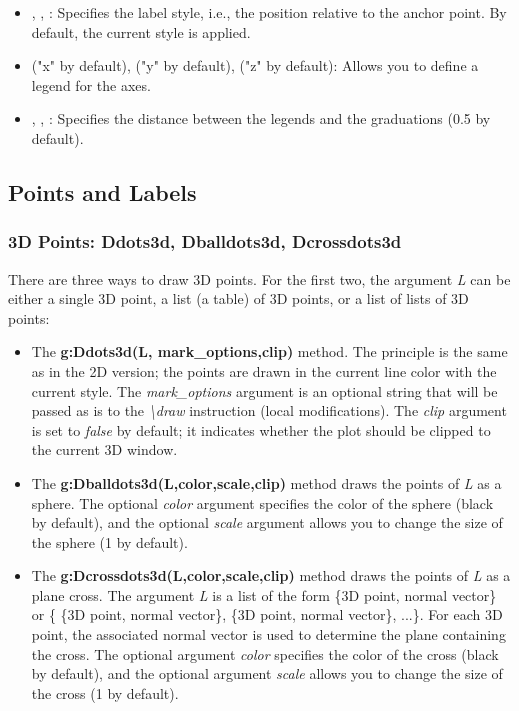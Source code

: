 \begin{itemize}
    \item {}, , : Specifies the label style, i.e., the position relative to the anchor point. By default, the current style is applied.

    \item {} ("x" by default),  ("y" by default),  ("z" by default): Allows you to define a legend for the axes.

    \item {}, , : Specifies the distance between the legends and the graduations (0.5 by default).
\end{itemize}

\subsection{Points and Labels}

\subsubsection{3D Points: Ddots3d, Dballdots3d, Dcrossdots3d}

There are three ways to draw 3D points. For the first two, the argument \emph{L} can be either a single 3D point, a list (a table) of 3D points, or a list of lists of 3D points:

\begin{itemize}
    \item The \textbf{g:Ddots3d(L, mark\_options,clip)} method. The principle is the same as in the 2D version; the points are drawn in the current line color with the current style. The \emph{mark\_options} argument is an optional string that will be passed as is to the \emph{\textbackslash draw} instruction (local modifications). The \emph{clip} argument is set to \emph{false} by default; it indicates whether the plot should be clipped to the current 3D window.

    \item The \textbf{g:Dballdots3d(L,color,scale,clip)} method draws the points of \emph{L} as a sphere. The optional \emph{color} argument specifies the color of the sphere (black by default), and the optional \emph{scale} argument allows you to change the size of the sphere (1 by default).

    \item The \textbf{g:Dcrossdots3d(L,color,scale,clip)} method draws the points of \emph{L} as a plane cross. The argument \emph{L} is a list of the form \{3D point, normal vector\} or \{ \{3D point, normal vector\}, \{3D point, normal vector\}, ...\}. For each 3D point, the associated normal vector is used to determine the plane containing the cross. The optional argument \emph{color} specifies the color of the cross (black by default), and the optional argument \emph{scale} allows you to change the size of the cross (1 by default).
\end{itemize}

